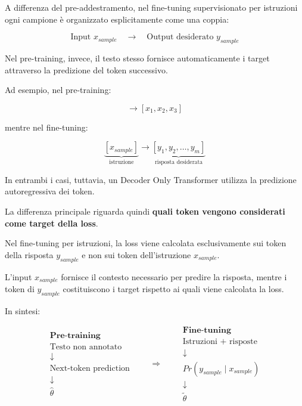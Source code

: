 A differenza del pre-addestramento, nel fine-tuning supervisionato per
istruzioni ogni campione è organizzato esplicitamente come una coppia:

\begin{equation}
\boxed{
\text{Input }x_{sample}
\quad\longrightarrow\quad
\text{Output desiderato }y_{sample}
}
\end{equation}

Nel pre-training, invece, il testo stesso fornisce automaticamente i
target attraverso la predizione del token successivo.

Ad esempio, nel pre-training:

\begin{equation}
[x_0,x_1,x_2]
\longrightarrow
[x_1,x_2,x_3]
\end{equation}

mentre nel fine-tuning:

\begin{equation}
\underbrace{[x_{sample}]}_{\text{istruzione}}
\longrightarrow
\underbrace{[y_1,y_2,\dots,y_m]}_{\text{risposta desiderata}}
\end{equation}

In entrambi i casi, tuttavia, un Decoder Only Transformer utilizza la
predizione autoregressiva dei token.

La differenza principale riguarda quindi \textbf{quali token vengono
considerati come target della loss}.

\begin{warning}
Nel fine-tuning per istruzioni, la loss viene calcolata esclusivamente
sui token della risposta $y_{sample}$ e non sui token dell'istruzione
$x_{sample}$.

L'input $x_{sample}$ fornisce il contesto necessario per predire la
risposta, mentre i token di $y_{sample}$ costituiscono i target rispetto
ai quali viene calcolata la loss.
\end{warning}

In sintesi:

\begin{equation}
\boxed{
\begin{array}{c}
\textbf{Pre-training}\\
\text{Testo non annotato}
\\
\downarrow
\\
\text{Next-token prediction}
\\
\downarrow
\\
\hat{\theta}
\end{array}
}
\qquad
\Longrightarrow
\qquad
\boxed{
\begin{array}{c}
\textbf{Fine-tuning}\\
\text{Istruzioni + risposte}
\\
\downarrow
\\
Pr(y_{sample}\mid x_{sample})
\\
\downarrow
\\
\tilde{\theta}
\end{array}
}
\end{equation}

